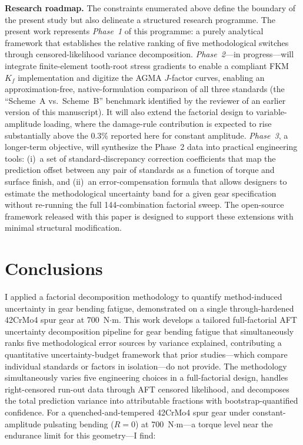 \documentclass[twocolumn,12pt,a4paper]{article}
\begin{document}
\medskip
\noindent\textbf{Research roadmap.}
The constraints enumerated above define the boundary of the present
study but also delineate a structured research programme. The present
work represents \emph{Phase~1} of this programme: a purely analytical
framework that establishes the relative ranking of five
methodological switches through censored-likelihood variance
decomposition. \emph{Phase~2}---in progress---will
integrate finite-element tooth-root stress gradients to enable a
compliant FKM $K_f$ implementation and digitize the AGMA $J$-factor
curves, enabling an approximation-free, native-formulation
comparison of all three standards (the ``Scheme~A vs.\ Scheme~B''
benchmark identified by the reviewer of an earlier version of this
manuscript). It will also extend the factorial design to
variable-amplitude loading, where the damage-rule contribution is
expected to rise substantially above the 0.3\% reported here for
constant amplitude. \emph{Phase~3}, a longer-term objective, will
synthesize the Phase~2 data into practical engineering tools: (i)~a
set of standard-discrepancy correction coefficients that map the
prediction offset between any pair of standards as a function of
torque and surface finish, and (ii)~an error-compensation formula
that allows designers to estimate the methodological uncertainty
band for a given gear specification without re-running the full
144-combination factorial sweep. The open-source framework released
with this paper is designed to support these extensions with
minimal structural modification.

\section{Conclusions}
\label{sec:conclusions}

I applied a factorial decomposition methodology to quantify
method-induced uncertainty in gear bending fatigue, demonstrated
on a single through-hardened 42CrMo4 spur gear at 700~N$\cdot$m.
This work develops a tailored full-factorial AFT uncertainty
decomposition pipeline for gear bending fatigue that
simultaneously ranks five methodological error sources by variance
explained, contributing a quantitative uncertainty-budget framework
that prior studies---which compare individual standards or factors in
isolation---do not provide.
The methodology
simultaneously varies five engineering choices in a full-factorial
design, handles right-censored run-out data through AFT censored
likelihood, and decomposes the total prediction variance into
attributable fractions with bootstrap-quantified confidence. For a
quenched-and-tempered 42CrMo4 spur gear under constant-amplitude
pulsating bending ($R=0$) at 700~N$\cdot$m---a torque level near the
endurance limit for this geometry---I find:
\end{document}
